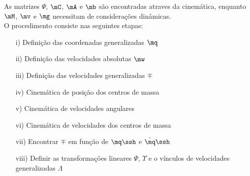 As matrizes $\mathbb{\Psi}$, $\mC$, $\mA$ e $\mb$ s\~ao encontradas atraves da cinem\'atica, enquanto $\mM$, $\mv$ e $\mg$ necessitam de considera\c{c}\~oes din\^amicas. \\

O procedimento consiste nas seguintes etapas:

\begin{itemize}
\item[i)] Defini\c{c}\~ao das coordenadas generalizadas $\mq$
\item[ii)] Defini\c{c}\~ao das velocidades absolutas  $\mw$
\item[iii)] Defini\c{c}\~ao das velocidades generalizadas $\mp$
\item[iv)] Cinem\'atica de posição dos centros de massa
\item[v)] Cinem\'atica de velocidades angulares
\item[vi)] Cinem\'atica de velocidades dos centros de massa
\item[vii)] Encontrar $\mp$ em função de $\mq\ssh$ e $\dot{\mq}\ssh$
\item[viii)] Definir as transforma\c{c}\~oes lineares $\mathbb{\Psi}$, $\mathbb{\Upsilon}$ e o vínculos de velocidades generalizadas $\mathbb{\Lambda}$
\end{itemize}


